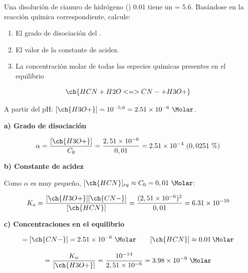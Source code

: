 \begin{exerciseEVAU}
     Una disolución de cianuro de hidrógeno () \qty{0.01}{\M} tiene un \pH = \num{5.6}. Basándose en la reacción química correspondiente, calcule:
    \begin{enumerate}[label=\letraminuscula]
        \item El grado de disociación del .
        \item El valor de la constante de acidez.
        \item La concentración molar de todas las especies químicas presentes en el equilibrio
    \end{enumerate}
    \begin{solu}

        \begin{equation*}
            \ch{HCN + H2O <=> CN- + H3O+}
        \end{equation*}

        A partir del pH: \([\ch{H3O+}] = 10^{-5,6} = \num{2.51e-6} \ \si{\Molar}\).

        \textbf{a) Grado de disociación}

        \begin{equation*}
            \alpha = \dfrac{[\ch{H3O+}]}{C_0} = \dfrac{2,51\times10^{-6}}{0,01} = \num{2.51e-4} \ (0,0251\ \%)
        \end{equation*}

        \textbf{b) Constante de acidez}

        Como \(\alpha\) es muy pequeño, \([\ch{HCN}]_{eq} \approx C_0 = 0,01 \ \si{\Molar}\):

        \begin{equation*}
            K_a = \dfrac{[\ch{H3O+}][\ch{CN-}]}{[\ch{HCN}]} = \dfrac{(2,51\times10^{-6})^2}{0,01} = \num{6.31e-10}
        \end{equation*}

        \textbf{c) Concentraciones en el equilibrio}

        \begin{equation*}
            [\ch{H3O+}] = [\ch{CN-}] = \num{2.51e-6} \ \si{\Molar} \qquad [\ch{HCN}] \approx \SI{0.01}{\Molar}
        \end{equation*}

        \begin{equation*}
            [\ch{OH-}] = \dfrac{K_w}{[\ch{H3O+}]} = \dfrac{10^{-14}}{2,51\times10^{-6}} = \num{3.98e-9} \ \si{\Molar}
        \end{equation*}

    \end{solu}
\end{exerciseEVAU}

